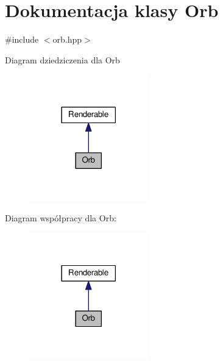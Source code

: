 \hypertarget{class_orb}{}\section{Dokumentacja klasy Orb}
\label{class_orb}


{\ttfamily \#include $<$orb.\+hpp$>$}



Diagram dziedziczenia dla Orb
\nopagebreak
\begin{figure}[H]
\begin{center}
\leavevmode
\includegraphics[width=146pt]{class_orb__inherit__graph}
\end{center}
\end{figure}


Diagram współpracy dla Orb\+:
\nopagebreak
\begin{figure}[H]
\begin{center}
\leavevmode
\includegraphics[width=146pt]{class_orb__coll__graph}
\end{center}
\end{figure}
